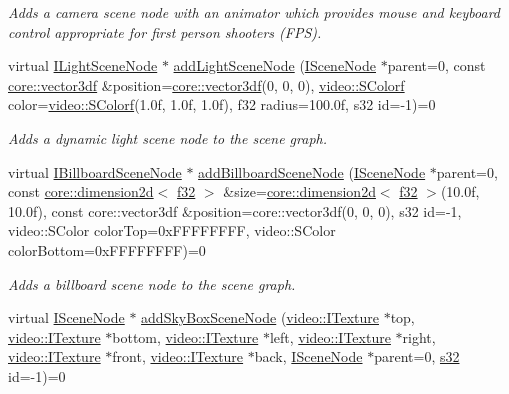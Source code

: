 \begin{DoxyCompactItemize}
\begin{DoxyCompactList}\small\item\em Adds a camera scene node with an animator which provides mouse and keyboard control appropriate for first person shooters (F\+PS). \end{DoxyCompactList}\item 
virtual \hyperlink{classirr_1_1scene_1_1ILightSceneNode}{I\+Light\+Scene\+Node} $\ast$ \hyperlink{classirr_1_1scene_1_1ISceneManager_a2e6442f8c95a544c355bd137ccdb7095}{add\+Light\+Scene\+Node} (\hyperlink{classirr_1_1scene_1_1ISceneNode}{I\+Scene\+Node} $\ast$parent=0, const \hyperlink{namespaceirr_1_1core_ae6e2b2a6c552833ebbd5b7463d03586b}{core\+::vector3df} \&position=\hyperlink{namespaceirr_1_1core_ae6e2b2a6c552833ebbd5b7463d03586b}{core\+::vector3df}(0, 0, 0), \hyperlink{classirr_1_1video_1_1SColorf}{video\+::\+S\+Colorf} color=\hyperlink{classirr_1_1video_1_1SColorf}{video\+::\+S\+Colorf}(1.\+0f, 1.\+0f, 1.\+0f), f32 radius=100.\+0f, s32 id=-\/1)=0
\begin{DoxyCompactList}\small\item\em Adds a dynamic light scene node to the scene graph. \end{DoxyCompactList}\item 
virtual \hyperlink{classirr_1_1scene_1_1IBillboardSceneNode}{I\+Billboard\+Scene\+Node} $\ast$ \hyperlink{classirr_1_1scene_1_1ISceneManager_a00266a58b97e827acd9e105806a99c3a}{add\+Billboard\+Scene\+Node} (\hyperlink{classirr_1_1scene_1_1ISceneNode}{I\+Scene\+Node} $\ast$parent=0, const \hyperlink{classirr_1_1core_1_1dimension2d}{core\+::dimension2d}$<$ \hyperlink{namespaceirr_a0277be98d67dc26ff93b1a6a1d086b07}{f32} $>$ \&size=\hyperlink{classirr_1_1core_1_1dimension2d}{core\+::dimension2d}$<$ \hyperlink{namespaceirr_a0277be98d67dc26ff93b1a6a1d086b07}{f32} $>$(10.\+0f, 10.\+0f), const core\+::vector3df \&position=core\+::vector3df(0, 0, 0), s32 id=-\/1, video\+::\+S\+Color color\+Top=0x\+F\+F\+F\+F\+F\+F\+F\+F, video\+::\+S\+Color color\+Bottom=0x\+F\+F\+F\+F\+F\+F\+F\+F)=0
\begin{DoxyCompactList}\small\item\em Adds a billboard scene node to the scene graph. \end{DoxyCompactList}\item 
virtual \hyperlink{classirr_1_1scene_1_1ISceneNode}{I\+Scene\+Node} $\ast$ \hyperlink{classirr_1_1scene_1_1ISceneManager_a2b08b9f20ec62faeffc02b9fed9fd683}{add\+Sky\+Box\+Scene\+Node} (\hyperlink{classirr_1_1video_1_1ITexture}{video\+::\+I\+Texture} $\ast$top, \hyperlink{classirr_1_1video_1_1ITexture}{video\+::\+I\+Texture} $\ast$bottom, \hyperlink{classirr_1_1video_1_1ITexture}{video\+::\+I\+Texture} $\ast$left, \hyperlink{classirr_1_1video_1_1ITexture}{video\+::\+I\+Texture} $\ast$right, \hyperlink{classirr_1_1video_1_1ITexture}{video\+::\+I\+Texture} $\ast$front, \hyperlink{classirr_1_1video_1_1ITexture}{video\+::\+I\+Texture} $\ast$back, \hyperlink{classirr_1_1scene_1_1ISceneNode}{I\+Scene\+Node} $\ast$parent=0, \hyperlink{namespaceirr_ac66849b7a6ed16e30ebede579f9b47c6}{s32} id=-\/1)=0

\end{DoxyCompactItemize}
